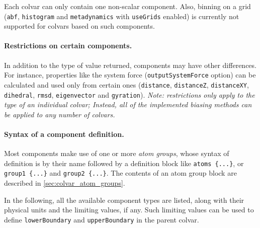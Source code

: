 Each colvar can only contain one non-scalar component.  Also, binning
on a grid (\texttt{abf}, \texttt{histogram} and \texttt{metadynamics}
with \texttt{useGrids} enabled) is currently not supported for colvars
based on such components.


\paragraph*{Restrictions on certain components.}  In addition to the
type of value returned, components may have other differences.  For
instance, properties like the system force (\texttt{outputSystemForce}
option) can be calculated and used only from certain ones
(\texttt{distance}, \texttt{distanceZ}, \texttt{distanceXY},
\texttt{dihedral}, \texttt{rmsd}, \texttt{eigenvector} and
\texttt{gyration}).  \emph{Note: restrictions only apply to the type
  of an individual colvar; Instead, all of the implemented biasing
  methods can be applied to any number of colvars.}


\paragraph*{Syntax of a component definition.}  Most components make
use of one or more \emph{atom groups}, whose syntax of definition is
by their name followed by a definition block like
\texttt{atoms~\{...\}}, or \texttt{group1~\{...\}} and
\texttt{group2~\{...\}}.  The contents of an atom group block are
described in \ref{sec:colvar_atom_groups}.

In the following, all the available component types are listed, along
with their physical units and the limiting values, if any.  Such
limiting values can be used to define \texttt{lowerBoundary} and
\texttt{upperBoundary} in the parent colvar.


